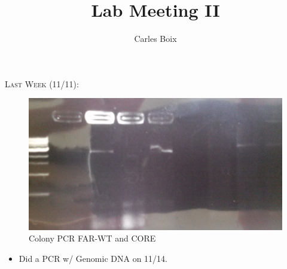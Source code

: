 \documentclass{beamer}
\title[Lab Meeting II]{Lab Meeting II}
\author{Carles Boix}
\begin{document}
\begin{frame}
    \begin{center}
        {\large \textsc{Last Week (11/11):}}
    \end{center}
    \begin{figure}[ht!]
        \centering
        \includegraphics[width=.6\textwidth]{farwtcore1.png}
        \caption{Colony PCR FAR-WT and CORE}
        \label{fig:pcr}
    \end{figure}

    \begin{itemize}
        \item Did a PCR w/ Genomic DNA on 11/14.
    \end{itemize}
\end{frame}
\end{document}
